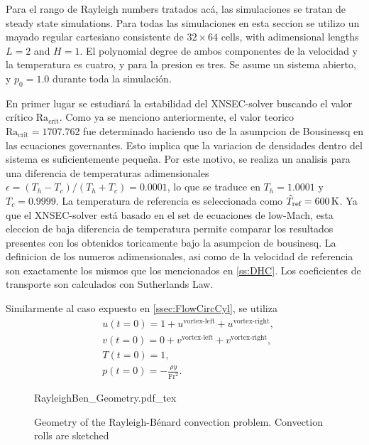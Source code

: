 Para el rango de Rayleigh numbers tratados acá, las simulaciones se tratan de steady state simulations. Para todas las simulaciones en esta seccion se utilizo un mayado regular cartesiano consistente de $32\times64$ cells, with adimensional lengths $L = 2$ and $H = 1$. El polynomial degree de ambos componentes de la velocidad y la temperatura es cuatro, y para la presion es tres. Se asume un sistema abierto, y $p_0 = 1.0$ durante toda la simulación.

En primer lugar se estudiará la estabilidad del XNSEC-solver buscando el valor crítico $\text{Ra}_{\text{crit}}$. Como ya se menciono anteriormente, el valor teorico $\text{Ra}_{\text{crit}} = 1707.762$ fue determinado haciendo uso de la asumpcion de Bousinessq en las ecuaciones governantes. Esto implica que la variacion de densidades dentro del sistema es suficientemente pequeña. Por este motivo, se realiza un analisis  para una diferencia de temperaturas adimensionales $\epsilon = (T_h-T_c)/(T_h+T_c) = 0.0001$, lo que se traduce en $T_h = 1.0001$ y $T_c = 0.9999$. La temperatura de referencia es seleccionada como $\hat T_{\text{ref}} = \SI{600}{\kelvin}$. Ya que el XNSEC-solver está basado en el set de ecuaciones de low-Mach, esta eleccion de baja diferencia de temperatura permite comparar los resultados presentes con los obtenidos toricamente bajo la asumpcion de bousinesq. La definicion de los numeros adimensionales, asi como de la velocidad de referencia son exactamente los mismos que los mencionados en \cref{ss:DHC}. Los coeficientes de transporte son calculados con Sutherlands Law. 

Similarmente al caso expuesto en \cref{ssec:FlowCircCyl}, se utiliza
\begin{subequations} 
	\begin{align}
		&u(t=0) = 1 + u^{\text{vortex-left}} + u^{\text{vortex-right}},  \\
		&v(t=0) = 0 + v^{\text{vortex-left}}+ v^{\text{vortex-right}},  \\
		&T(t=0) = 1,\\
		&p(t=0) = -\frac{\rho y}{\text{Fr}^2}.
	\end{align}
\end{subequations}


\begin{figure}[bt]
	\begin{center}
		\def\svgwidth{0.83\textwidth}
		{RayleighBen_Geometry.pdf_tex}
		\caption{Geometry of the Rayleigh-Bénard convection problem. Convection rolls are sketched}
		\label{fig:RayBenGeometryPeriodic}
	\end{center}
\end{figure}

